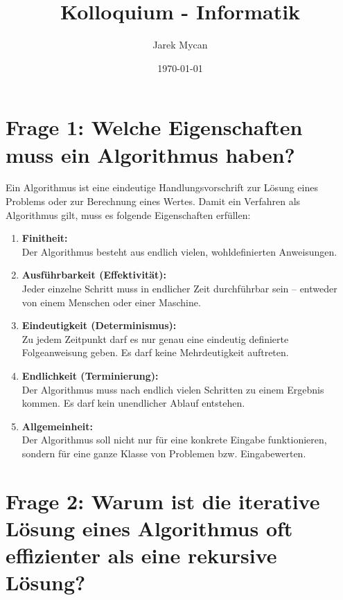\documentclass{article}
\title{}
\author{}
\date{}
\begin{document}
	\title{Kolloquium - Informatik }
	\author{Jarek Mycan}
	\date{\today}
	\maketitle
	
	\section*{Frage 1: Welche Eigenschaften muss ein Algorithmus haben?}
	
	Ein Algorithmus ist eine eindeutige Handlungsvorschrift zur Lösung eines Problems oder zur Berechnung eines Wertes. Damit ein Verfahren als Algorithmus gilt, muss es folgende Eigenschaften erfüllen:
	
	\begin{enumerate}
		\item \textbf{Finitheit:} \\
		Der Algorithmus besteht aus endlich vielen, wohldefinierten Anweisungen.
		
		\item \textbf{Ausführbarkeit (Effektivität):} \\
		Jeder einzelne Schritt muss in endlicher Zeit durchführbar sein – entweder von einem Menschen oder einer Maschine.
		
		\item \textbf{Eindeutigkeit (Determinismus):} \\
		Zu jedem Zeitpunkt darf es nur genau eine eindeutig definierte Folgeanweisung geben. Es darf keine Mehrdeutigkeit auftreten.
		
		\item \textbf{Endlichkeit (Terminierung):} \\
		Der Algorithmus muss nach endlich vielen Schritten zu einem Ergebnis kommen. Es darf kein unendlicher Ablauf entstehen.
		
		\item \textbf{Allgemeinheit:} \\
		Der Algorithmus soll nicht nur für eine konkrete Eingabe funktionieren, sondern für eine ganze Klasse von Problemen bzw. Eingabewerten.
	\end{enumerate}
	
	\section*{Frage 2: Warum ist die iterative Lösung eines Algorithmus oft effizienter als eine rekursive Lösung?}
	
\end{document}
